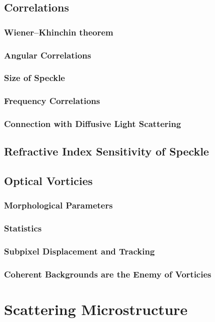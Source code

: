 \documentclass[a4paper,titlepage,onecolumn]{report}
\begin{document}
 \section{Correlations}
  \subsection{Wiener–Khinchin theorem}
  \subsection{Angular Correlations}
  \subsection{Size of Speckle}
  \subsection{Frequency Correlations}
  \subsection{Connection with Diffusive Light Scattering}
 \section{Refractive Index Sensitivity of Speckle}
 \section{Optical Vorticies}
  \subsection{Morphological Parameters}
  \subsection{Statistics}
  \subsection{Subpixel Displacement and Tracking}
  \subsection{Coherent Backgrounds are the Enemy of Vorticies}

\chapter{Scattering Microstructure} \label{ch:scattmicro}
\end{document}
